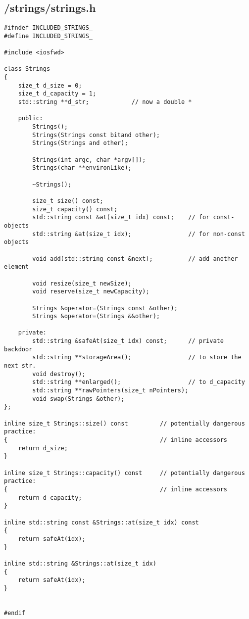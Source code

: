 \documentclass{article}
\begin{document}
\subsection*{/strings/strings.h}
\begin{verbatim}
#ifndef INCLUDED_STRINGS_
#define INCLUDED_STRINGS_

#include <iosfwd>

class Strings
{
    size_t d_size = 0;
    size_t d_capacity = 1;
    std::string **d_str;            // now a double *

    public:
        Strings();
        Strings(Strings const bitand other);
        Strings(Strings and other);

        Strings(int argc, char *argv[]);
        Strings(char **environLike);

        ~Strings();

        size_t size() const;
        size_t capacity() const;
        std::string const &at(size_t idx) const;    // for const-objects
        std::string &at(size_t idx);                // for non-const objects

        void add(std::string const &next);          // add another element

        void resize(size_t newSize);
        void reserve(size_t newCapacity);

        Strings &operator=(Strings const &other);
        Strings &operator=(Strings &&other);
        
    private:
        std::string &safeAt(size_t idx) const;      // private backdoor
        std::string **storageArea();                // to store the next str.
        void destroy();                 
        std::string **enlarged();                   // to d_capacity
        std::string **rawPointers(size_t nPointers);
        void swap(Strings &other);
};

inline size_t Strings::size() const         // potentially dangerous practice:
{                                           // inline accessors
    return d_size;
}

inline size_t Strings::capacity() const     // potentially dangerous practice:
{                                           // inline accessors
    return d_capacity;
}

inline std::string const &Strings::at(size_t idx) const
{
    return safeAt(idx);
}

inline std::string &Strings::at(size_t idx)
{
    return safeAt(idx);
}

        
#endif


\end{verbatim}
\end{document}

